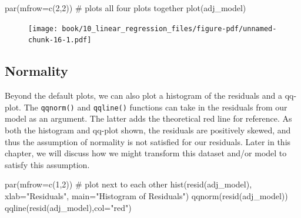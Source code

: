 \documentclass[
  letterpaper,
]{krantz}
\makeatletter
\newenvironment{Shaded}{\begin{snugshade}}{\end{snugshade}}
\newcommand{\AttributeTok}[1]{\textcolor[rgb]{0.40,0.45,0.13}{#1}}
\newcommand{\CommentTok}[1]{\textcolor[rgb]{0.37,0.37,0.37}{#1}}
\newcommand{\DecValTok}[1]{\textcolor[rgb]{0.68,0.00,0.00}{#1}}
\newcommand{\FunctionTok}[1]{\textcolor[rgb]{0.28,0.35,0.67}{#1}}
\newcommand{\NormalTok}[1]{\textcolor[rgb]{0.00,0.23,0.31}{#1}}
\newcommand{\StringTok}[1]{\textcolor[rgb]{0.13,0.47,0.30}{#1}}
\newenvironment{kframe}{%
\medskip{}
\setlength{\fboxsep}{.8em}
 \def\at@end@of@kframe{}%
 \ifinner\ifhmode%
  \def\at@end@of@kframe{\end{minipage}}%
  \begin{minipage}{\columnwidth}%
 \fi\fi%
 \def\FrameCommand##1{\hskip\@totalleftmargin \hskip-\fboxsep
 \colorbox{shadecolor}{##1}\hskip-\fboxsep
     \hskip-\linewidth \hskip-\@totalleftmargin \hskip\columnwidth}%
 \MakeFramed {\advance\hsize-\width
   \@totalleftmargin\z@ \linewidth\hsize
   \@setminipage}}%
 {\par\unskip\endMakeFramed%
 \at@end@of@kframe}
\renewenvironment{Shaded}{\begin{kframe}}{\end{kframe}}
\makeatother
\begin{document}
\begin{Shaded}
\begin{Highlighting}[]
\FunctionTok{par}\NormalTok{(}\AttributeTok{mfrow=}\FunctionTok{c}\NormalTok{(}\DecValTok{2}\NormalTok{,}\DecValTok{2}\NormalTok{)) }\CommentTok{\# plots all four plots together}
\FunctionTok{plot}\NormalTok{(adj\_model)}
\end{Highlighting}
\end{Shaded}

\begin{figure}[H]

{\centering \texttt{[image: book/10\_linear\_regression\_files/figure-pdf/unnamed-chunk-16-1.pdf]}

}

\end{figure}

\hypertarget{normality}{%
\subsection{Normality}\label{normality}}

Beyond the default plots, we can also plot a histogram of the residuals
and a qq-plot. The \texttt{qqnorm()} and \texttt{qqline()} functions can
take in the residuals from our model as an argument. The latter adds the
theoretical red line for reference. As both the histogram and qq-plot
shown, the residuals are positively skewed, and thus the assumption of
normality is not satisfied for our residuals. Later in this chapter, we
will discuss how we might transform this dataset and/or model to satisfy
this assumption.

\begin{Shaded}
\begin{Highlighting}[]
\FunctionTok{par}\NormalTok{(}\AttributeTok{mfrow=}\FunctionTok{c}\NormalTok{(}\DecValTok{1}\NormalTok{,}\DecValTok{2}\NormalTok{)) }\CommentTok{\# plot next to each other}
\FunctionTok{hist}\NormalTok{(}\FunctionTok{resid}\NormalTok{(adj\_model), }\AttributeTok{xlab=}\StringTok{"Residuals"}\NormalTok{, }\AttributeTok{main=}\StringTok{"Histogram of Residuals"}\NormalTok{) }
\FunctionTok{qqnorm}\NormalTok{(}\FunctionTok{resid}\NormalTok{(adj\_model))}
\FunctionTok{qqline}\NormalTok{(}\FunctionTok{resid}\NormalTok{(adj\_model),}\AttributeTok{col=}\StringTok{"red"}\NormalTok{) }
\end{Highlighting}
\end{Shaded}
\end{document}
